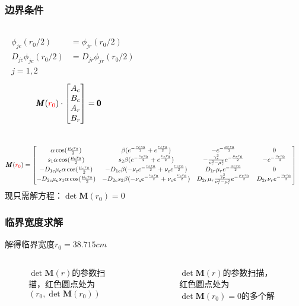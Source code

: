 \documentclass[handout,10pt]{beamer}
\begin{document}
\begin{frame}
\frametitle{边界条件}
\begin{columns}
\begin{align*}
    \begin{split}
        \phi_{jc}(r_0 / 2) &= \phi_{jr}(r_0 / 2) \\
        D_{jc}\phi_{jc}(r_0 / 2) &= D_{jr}\phi_{jr}(r_0 / 2) \\
        j = 1,2
    \end{split}
\end{align*}
\begin{align*}
    \label{eq:M_AB}
    \pmb{M}(\textcolor{red}{r_0}) \cdot \begin{bmatrix}
        A_c \\
        B_c \\
        A_r \\
        B_r
    \end{bmatrix} &= \pmb{0}
\end{align*}
\end{columns}
\tiny
\begin{align*}
    \pmb{M}(\textcolor{red}{r_0}) &= 
    \begin{bmatrix}
        \alpha\cos(\frac{\mu_c r_0}{2}) & \beta(e^{-\frac{\nu_c r_0}{2}}+e^{\frac{\nu_c r_0}{2}}) & -e^{-\frac{\mu_r r_0}{2}} & 0 \\
        s_1\alpha\cos(\frac{\mu_c r_0}{2}) & s_2\beta(e^{-\frac{\nu_c r_0}{2}}+e^{\frac{\nu_c r_0}{2}}) & -\frac{\gamma_r^2}{\nu_r^2 - \mu_r^2}e^{-\frac{\mu_r r_0}{2}} & -e^{-\frac{\nu_r r_0}{2}} \\
        -D_{1c}\mu_c\alpha\cos(\frac{\mu_c r_0}{2}) & -D_{1c}\beta(-\nu_c e^{-\frac{\nu_c r_0}{2}}+\nu_c e^{\frac{\nu_c r_0}{2}}) & D_{1r}\mu_r e^{-\frac{\mu_r r_0}{2}} & 0 \\
        -D_{2c}\mu_c s_1\alpha\cos(\frac{\mu_c r_0}{2}) & -D_{2c}s_2\beta(-\nu_c e^{-\frac{\nu_c r_0}{2}}+\nu_c e^{\frac{\nu_c r_0}{2}}) & D_{2r}\mu_r\frac{\gamma_r^2}{\nu_r^2 - \mu_r^2}e^{-\frac{\mu_r r_0}{2}} & D_{2r}\nu_r e^{-\frac{\nu_r r_0}{2}}
    \end{bmatrix}
\end{align*}
\normalsize
现只需解方程：$\det \pmb{M}(r_0)=0$
\end{frame}

\begin{frame}
\frametitle{临界宽度求解}
解得临界宽度$r_0=38.715\si{cm}$
\begin{columns}
\begin{figure}[H]
    \centering
    
    \caption{$\det \pmb{M}(r)$的参数扫描，红色圆点处为$\left(r_0,\det \pmb{M}(r_0)\right)$}
    \label{fig:det_M}
\end{figure}
\begin{figure}[H]
    \centering
    
    \caption{$\det \pmb{M}(r)$的参数扫描，红色圆点处为$\det \pmb{M}(r_0)=0$的多个解}
    \label{fig:det_M_r_far}
\end{figure}
\end{columns}
\end{frame}
\end{document}
